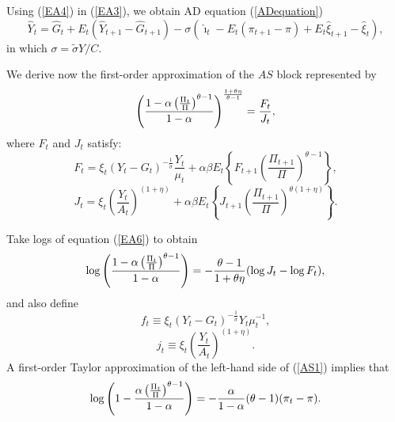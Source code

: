 \documentclass[11pt,aspectratio=169]{beamer}
\begin{document}
\begin{frame}
Using (\ref{EA4}) in (\ref{EA3}), we
obtain AD equation (\ref{ADequation}) 
\begin{equation*}
\hat{Y}_{t}=\hat{G}_{t}+E_{t}(\hat{Y}_{t+1}-\hat{G}_{t+1})-\sigma \left( 
\hat{\imath}_{t}-E_{t}(\pi _{t+1}-\pi )+E_{t}\hat{\xi}_{t+1}-\hat{\xi}%
_{t}\right) ,
\end{equation*}%
in which $\sigma =\tilde{\sigma}Y/C.$

\end{frame}
\begin{frame} We derive now the first-order approximation of the $AS$ block represented by 
\begin{equation}
\left( \frac{1-\alpha \left( \frac{\Pi _{t}}{\Pi }\right) ^{\theta -1}}{%
1-\alpha }\right) ^{\frac{1+\theta \eta }{\theta -1}}=\frac{F_{t}}{J_{t}},
\label{EA6}
\end{equation}%
where $F_{t}$ and $J_{t}$ satisfy:%
\begin{equation}
F_{t}=\xi _{t}(Y_{t}-G_{t})^{-\frac{1}{\tilde{\sigma}}}\frac{Y_{t}}{\mu _{t}}%
+\alpha \beta E_{t}\left\{ F_{t+1}\left( \frac{\Pi _{t+1}}{\Pi }\right)
^{\theta -1}\right\} ,  \label{EA7}
\end{equation}%
\begin{equation}
J_{t}=\xi _{t}\left( \frac{Y_{t}}{A_{t}}\right) ^{(1+\eta )}+\alpha \beta
E_{t}\left\{ J_{t+1}\left( \frac{\Pi _{t+1}}{\Pi }\right) ^{\theta (1+\eta
)}\right\} .  \label{EA8}
\end{equation}
\end{frame}
\begin{frame}
Take logs of equation (\ref{EA6}) to obtain%
\begin{equation}
\log \left( \frac{1-\alpha \left( \frac{\Pi _{t}}{\Pi }\right) ^{\theta -1}}{%
1-\alpha }\right) =-\frac{\theta -1}{1+\theta \eta }(\log J_{t}-\log F_{t}),
\label{AS1}
\end{equation}%
and also define%
\begin{equation*}
f_{t}\equiv \xi _{t}(Y_{t}-G_{t})^{-\frac{1}{\tilde{\sigma}}}Y_{t}\mu
_{t}^{-1},
\end{equation*}%
\begin{equation*}
j_{t}\equiv \xi _{t}\left( \frac{Y_{t}}{A_{t}}\right) ^{(1+\eta )}.
\end{equation*}%
A first-order Taylor approximation of the left-hand side of (\ref{AS1})
implies that%
\begin{equation}
\log \left( 1-\frac{\alpha \left( \frac{\Pi _{t}}{\Pi }\right) ^{\theta -1}}{%
1-\alpha }\right) =-\frac{\alpha }{1-\alpha }(\theta -1)(\pi _{t}-\pi ).
\label{AS2}
\end{equation}%
\end{frame}
\end{document}
